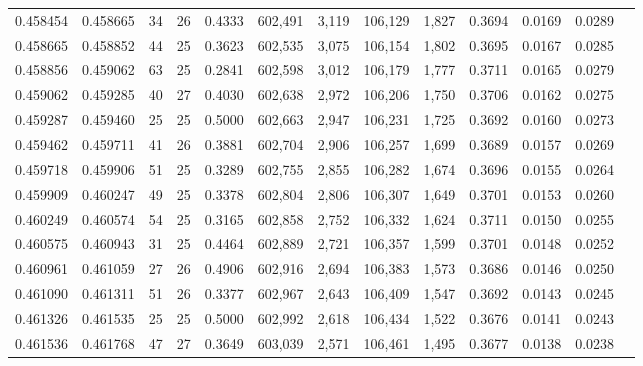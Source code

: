 \begin{tabular}{rrrrrrrrrrrrr}
0.458454 & 0.458665 &    34 &  26 &                                     0.4333 & 602,491 &   3,119 & 106,129 &   1,827 & 0.3694 & 0.0169 & 0.0289 \\
0.458665 & 0.458852 &    44 &  25 &                                     0.3623 & 602,535 &   3,075 & 106,154 &   1,802 & 0.3695 & 0.0167 & 0.0285 \\
0.458856 & 0.459062 &    63 &  25 &                                     0.2841 & 602,598 &   3,012 & 106,179 &   1,777 & 0.3711 & 0.0165 & 0.0279 \\
0.459062 & 0.459285 &    40 &  27 &                                     0.4030 & 602,638 &   2,972 & 106,206 &   1,750 & 0.3706 & 0.0162 & 0.0275 \\
0.459287 & 0.459460 &    25 &  25 &                                     0.5000 & 602,663 &   2,947 & 106,231 &   1,725 & 0.3692 & 0.0160 & 0.0273 \\
0.459462 & 0.459711 &    41 &  26 &                                     0.3881 & 602,704 &   2,906 & 106,257 &   1,699 & 0.3689 & 0.0157 & 0.0269 \\
0.459718 & 0.459906 &    51 &  25 &                                     0.3289 & 602,755 &   2,855 & 106,282 &   1,674 & 0.3696 & 0.0155 & 0.0264 \\
0.459909 & 0.460247 &    49 &  25 &                                     0.3378 & 602,804 &   2,806 & 106,307 &   1,649 & 0.3701 & 0.0153 & 0.0260 \\
0.460249 & 0.460574 &    54 &  25 &                                     0.3165 & 602,858 &   2,752 & 106,332 &   1,624 & 0.3711 & 0.0150 & 0.0255 \\
0.460575 & 0.460943 &    31 &  25 &                                     0.4464 & 602,889 &   2,721 & 106,357 &   1,599 & 0.3701 & 0.0148 & 0.0252 \\
0.460961 & 0.461059 &    27 &  26 &                                     0.4906 & 602,916 &   2,694 & 106,383 &   1,573 & 0.3686 & 0.0146 & 0.0250 \\
0.461090 & 0.461311 &    51 &  26 &                                     0.3377 & 602,967 &   2,643 & 106,409 &   1,547 & 0.3692 & 0.0143 & 0.0245 \\
0.461326 & 0.461535 &    25 &  25 &                                     0.5000 & 602,992 &   2,618 & 106,434 &   1,522 & 0.3676 & 0.0141 & 0.0243 \\
0.461536 & 0.461768 &    47 &  27 &                                     0.3649 & 603,039 &   2,571 & 106,461 &   1,495 & 0.3677 & 0.0138 & 0.0238 \\

\end{tabular}
